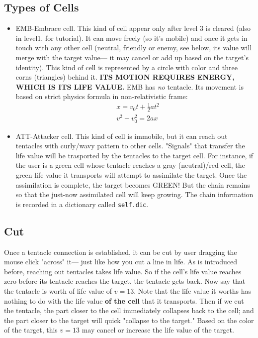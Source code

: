\documentclass[12pt]{article}
\begin{document}
\subsection{Types of Cells}
\begin{itemize}
\item EMB-Embrace cell. This kind of cell appear only after level 3 is cleared (also in level1, for tutorial). It can move freely (so it's mobile) and once it gets in touch with any other cell (neutral, friendly or enemy,
see below, its value will merge with the target value--- it may cancel or add up based on the target's identity). This kind of cell is represented by a circle with color and three corns (triangles)
behind it. \textbf{ITS MOTION REQUIRES ENERGY, WHICH IS ITS LIFE VALUE.} EMB has \textit{no} tentacle. Its movement is based on strict physics formula in non-relativistic frame:
\begin{eqnarray}
&x = v_0t+\frac {1}{2} at^2 \\
&v^2-v_0^2=2ax
\end{eqnarray}

\item ATT-Attacker cell. This kind of cell is immobile, but it can reach out tentacles with curly/wavy pattern to other cells. "Signals" that transfer the life value will be trasported by the tentacles to the target cell.
For instance, if the user is a green cell whose tentacle reaches a gray (neutral)/red  cell, the green life value it transports will attempt to assimilate the target.
Once the assimilation is complete, the target becomes GREEN! But the chain remains so that the just-now assimilated cell will keep growing. The chain information is recorded in a dictionary
called \texttt{self.dic}.
\end{itemize}

\subsection{Cut}
Once a tentacle connection is established, it can be cut by user dragging the mouse click "across" it--- just like how you cut a line in life. As is introduced before, reaching out tentacles 
takes life value. So if the cell's life value reaches zero before its tentacle reaches the target, the tentacle gets back. Now say that the tentacle is worth of life value of $v=13$. Note that 
the life value it worths has nothing to do with the life value \textbf{of the cell} that it transports. Then if we cut the tentacle, the part closer to the cell immediately collapses back to the cell;
and the part closer to the target will quick "collapse to the target." Based on the color of the target, this $v=13$ may cancel or increase the life value of the target.
\end{document}
